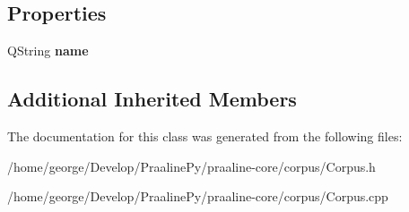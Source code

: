 \subsection*{Properties}
\begin{DoxyCompactItemize}
\item 
\mbox{\label{class_corpus_a90e1ba1705b04ad6d58810afbf08d9cd}} 
Q\+String {\bfseries name}
\end{DoxyCompactItemize}
\subsection*{Additional Inherited Members}


The documentation for this class was generated from the following files\+:\begin{DoxyCompactItemize}
\item 
/home/george/\+Develop/\+Praaline\+Py/praaline-\/core/corpus/Corpus.\+h\item 
/home/george/\+Develop/\+Praaline\+Py/praaline-\/core/corpus/Corpus.\+cpp\end{DoxyCompactItemize}
